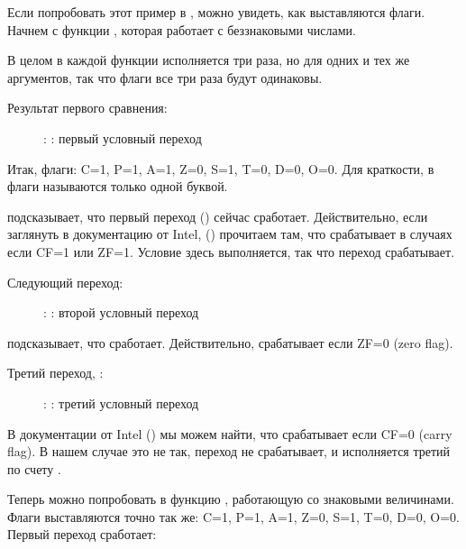 \clearpage
{}
\myindex{\olly}

Если попробовать этот пример в \olly, можно увидеть, как выставляются флаги.
Начнем с функции , которая работает с беззнаковыми числами.

В целом в каждой функции \CMP исполняется три раза, но для одних и тех же аргументов, 
так что флаги все три раза будут одинаковы.

Результат первого сравнения:

\begin{figure}[H]
\centering
{}
\caption{\olly: : первый условный переход}
\label{fig:jcc_olly_unsigned_1}
\end{figure}

Итак, флаги: C=1, P=1, A=1, Z=0, S=1, T=0, D=0, O=0.
Для краткости, в \olly флаги называются только одной буквой.

\olly подсказывает, что первый переход (\JBE) сейчас сработает.
Действительно, если заглянуть в документацию от Intel, 
() прочитаем там, что \JBE срабатывает в случаях если CF=1 или ZF=1.
Условие здесь выполняется, так что переход срабатывает.

\clearpage
Следующий переход:

\begin{figure}[H]
\centering
{}
\caption{\olly: : второй условный переход}
\label{fig:jcc_olly_unsigned_2}
\end{figure}

\olly подсказывает, что \JNZ сработает.
Действительно, \JNZ срабатывает если ZF=0 (zero flag).

\clearpage
Третий переход, \JNB:

\begin{figure}[H]
\centering
{}
\caption{\olly: : третий условный переход}
\label{fig:jcc_olly_unsigned_3}
\end{figure}

В документации от Intel () мы можем найти,
что \JNB срабатывает если CF=0 (carry flag).
В нашем случае это не так, переход не срабатывает, и исполняется третий по счету \printf.

\clearpage
Теперь можно попробовать в \olly функцию , работающую со знаковыми величинами.
Флаги выставляются точно так же: C=1, P=1, A=1, Z=0, S=1, T=0, D=0, O=0.
Первый переход \JLE сработает:

